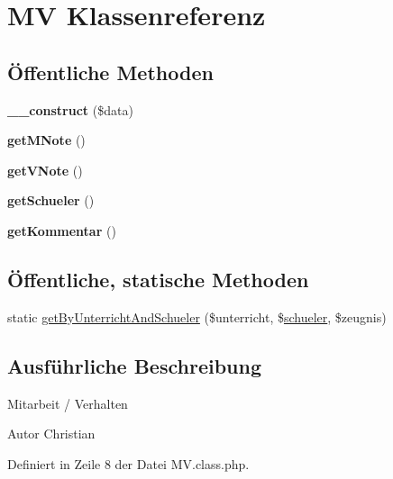 \hypertarget{class_m_v}{}\section{MV Klassenreferenz}
\label{class_m_v}
\subsection*{Öffentliche Methoden}
\begin{DoxyCompactItemize}
\item 
\mbox{\label{class_m_v_aeac54d5d0ff09c5d80817faea03197dd}} 
{\bfseries \+\_\+\+\_\+construct} (\$data)
\item 
\mbox{\label{class_m_v_a5649c8b6ef10c3dc594e3ed5e86dcdb3}} 
{\bfseries get\+M\+Note} ()
\item 
\mbox{\label{class_m_v_aabb788bee3ea35990e66e71706e8db33}} 
{\bfseries get\+V\+Note} ()
\item 
\mbox{\label{class_m_v_a48bbe0e89704a25b84c308a2aa2e1f5b}} 
{\bfseries get\+Schueler} ()
\item 
\mbox{\label{class_m_v_a34cfcd0dbe9d1225815835168c70586d}} 
{\bfseries get\+Kommentar} ()
\end{DoxyCompactItemize}
\subsection*{Öffentliche, statische Methoden}
\begin{DoxyCompactItemize}
\item 
static \mbox{\hyperlink{class_m_v_af9c7f6a0dbe70bca94e08a4d29a1c5db}{get\+By\+Unterricht\+And\+Schueler}} (\$unterricht, \$\mbox{\hyperlink{classschueler}{schueler}}, \$zeugnis)
\end{DoxyCompactItemize}


\subsection{Ausführliche Beschreibung}
Mitarbeit / Verhalten \begin{DoxyAuthor}{Autor}
Christian 
\end{DoxyAuthor}


Definiert in Zeile 8 der Datei M\+V.\+class.\+php.



